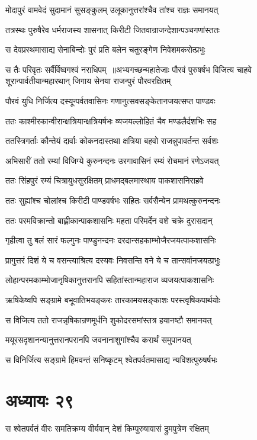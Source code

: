 \twolineshloka
{मोदापुरं वामवेदं सुदामानं सुसङ्कुलम्}
{उलूकानुत्तरांश्चैव तांश्च राज्ञः समानयत्}


\twolineshloka
{तत्रस्थः पुरुषैरेव धर्मराजस्य शासनात्}
{किरीटी जितवान्राजन्देशान्पञ्चगणांस्ततः}


\twolineshloka
{स देवप्रस्थमासाद्य सेनाबिन्दोः पुरं प्रति}
{बलेन चतुरङ्गेण निवेशमकरोत्प्रभुः}


स तैः परिवृतः सर्वैर्विष्वगश्वं नराधिपम् ॥अभ्यगच्छन्महातेजाः पौरवं पुरुषर्षभ
\twolineshloka
{विजित्य चाहवे शूरान्पार्वतीयान्महारथान्}
{जिगाय सेनया राजन्पुरं पौरवरक्षितम्}


\twolineshloka
{पौरवं युधि निर्जित्य दस्यून्पर्वतवासिनः}
{गणानुत्सवसङ्केतानजयत्सप्त पाण्डवः}


\twolineshloka
{ततः काश्मीरकान्वीरान्क्षत्रियान्क्षत्रियर्षभः}
{व्यजयल्लोहितं चैव मण्डलैर्दशभिः सह}


\twolineshloka
{ततस्त्रिगर्ताः कौन्तेयं दार्वाः कोकनदास्तथा}
{क्षत्रिया बहवो राजन्नुपावर्तन्त सर्वशः}


\twolineshloka
{अभिसारीं ततो रम्यां विजिग्ये कुरुनन्दनः}
{उरगावासिनं रम्यं रोचमानं रणेऽजयत्}


\twolineshloka
{ततः सिंहपुरं रम्यं चित्रायुधसुरक्षितम्}
{प्राधमद्बलमास्थाय पाकशासनिराहवे}


\twolineshloka
{ततः सुह्यांश्च चोलांश्च किरीटी पाण्डवर्षभः}
{सहितः सर्वसैन्येन प्रामथत्कुरुनन्दनः}


\twolineshloka
{ततः परमविक्रान्तो बाह्लीकान्पाकशासनिः}
{महता परिमर्देन वशे चक्रे दुरासदान्}


\twolineshloka
{गृहीत्वा तु बलं सारं फल्गुनः पाण्डुनन्दनः}
{दरदान्सहकाम्भोजैरजयत्पाकशासनिः}


\twolineshloka
{प्रागुत्तरं दिशं ये च वसन्त्याश्रित्य दस्यवः}
{निवसन्ति वने ये च तान्सर्वानजयत्प्रभुः}


\twolineshloka
{लोहान्परमकाम्भोजानृषिकानुत्तरानपि}
{सहितांस्तान्महाराज व्यजयत्पाकशासनिः}


\twolineshloka
{ऋषिकेष्वपि सङ्ग्रामे बभूवातिभयङ्करः}
{तारकामयसङ्काशः परस्त्वृषिकपार्थयोः}


\twolineshloka
{स विजित्य ततो राजन्नृषिकान्रणमूर्धनि}
{शुकोदरसमांस्तत्र हयानष्टौ समानयत्}


\twolineshloka
{मयूरसदृशानन्यानुत्तरानपरानपि}
{जवनानाशुगांश्चैव करार्थं समुपानयत्}


\twolineshloka
{स विनिर्जित्य सङ्ग्रामे हिमवन्तं सनिष्कृटम्}
{श्वेतपर्वतमासाद्य न्यविशत्पुरुषर्षभः}


\chapter{अध्यायः २९}
\twolineshloka
{स श्वेतपर्वतं वीरः समतिक्रम्य वीर्यवान्}
{देशं किम्पुरुषावासं द्रुमपुत्रेण रक्षितम्}


